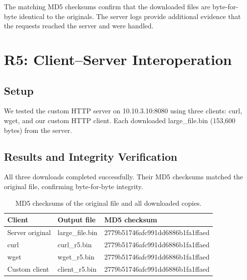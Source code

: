 \documentclass[12pt]{article}
\begin{document}
The matching MD5 checksums confirm that the downloaded files are byte-for-byte identical to the originals. The server logs provide additional evidence that the requests reached the server and were handled.

\newpage

\section{R5: Client--Server Interoperation}
\label{sec:r5}

\subsection{Setup}

We tested the custom HTTP server on 10.10.3.10:8080 using three clients: {curl}, {wget}, and our custom HTTP client. Each downloaded {large\_file.bin} (153,600 bytes) from the server.

\subsection{Results and Integrity Verification}

All three downloads completed successfully. Their MD5 checksums matched the original file, confirming byte-for-byte integrity.

\begin{table}[H]
    \centering
    \renewcommand{\arraystretch}{1.15}
    \setlength{\tabcolsep}{8pt}
    \begin{tabularx}{0.95\textwidth}{@{} l l X @{}}
        \toprule
        \textbf{Client} & \textbf{Output file} & \textbf{MD5 checksum} \\
        \midrule
        Server original & {large\_file.bin} &
        {\small{2779b51746afc991dd6886b1fa1ffaed}} \\
        {curl} & {curl\_r5.bin} &
        {\small{2779b51746afc991dd6886b1fa1ffaed}} \\
        {wget} & {wget\_r5.bin} &
        {\small{2779b51746afc991dd6886b1fa1ffaed}} \\
        Custom client & {client\_r5.bin} &
        {\small{2779b51746afc991dd6886b1fa1ffaed}} \\
        \bottomrule
    \end{tabularx}
    \caption{MD5 checksums of the original file and all downloaded copies.}
    \label{tab:r5_summary}
\end{table}
\end{document}
